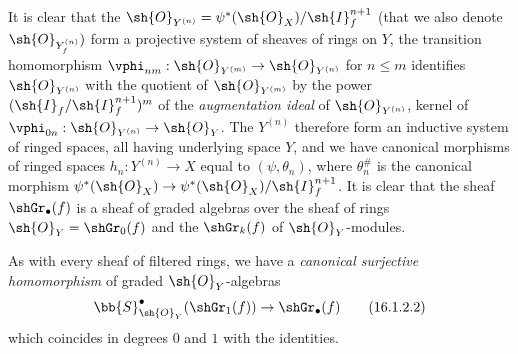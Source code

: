It is clear that the $\sh{O}_{Y^{(n)}} = \psi^*(\sh{O}_X)/\sh{I}_f^{n+1}$ (that we also denote $\sh{O}_{Y_f^{(n)}})$ form a
projective system of sheaves of rings on $Y$, the transition homomorphism $\vphi_{nm}:\sh{O}_{Y^{(m)}} \to \sh{O}_{Y^{(n)}}$ for $n \leq m$ identifies $\sh{O}_{Y^{(n)}}$ with the quotient of $\sh{O}_{Y^{(m)}}$ by the power $(\sh{I}_f/\sh{I}_f^{n+1} )^m$ of the \emph{augmentation ideal} of $\sh{O}_{Y^{(n)}}$, kernel of $\vphi_{0n}: \sh{O}_{Y^{(n)}} \to \sh{O}_{Y}$.
The $Y^{(n)}$ therefore form an inductive system of ringed spaces, all having underlying space $Y$, and we have canonical morphisms of ringed spaces $h_n: Y^{(n)} \to X$ equal to $(\psi, \theta_n)$, where $\theta^\#_n$ is the canonical morphism $\psi^*(\sh{O}_X) \to \psi^*(\sh{O}_X)/\sh{I}_f^{n+1}$.
It is clear that the sheaf $\shGr_\bullet(f)$ is a sheaf of graded algebras over the sheaf of rings $\sh{O}_Y = \shGr_0(f)$ and the $\shGr_k(f)$ of $\sh{O}_Y$-modules.

As with every sheaf of filtered rings, we have a \emph{canonical surjective homomorphism} of graded $\sh{O}_Y$-algebras
\[
  \label{IV.16.1.2.2}
  \bb{S}_{\sh{O}_Y}^\bullet(\shGr_1(f)) \to \shGr_\bullet(f)
  \tag{16.1.2.2}
\]
which coincides in degrees $0$ and $1$ with the identities.


